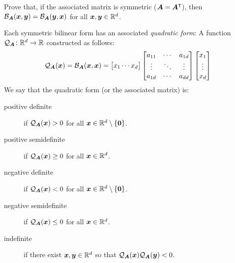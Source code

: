 \begin{problem}\label{problem:BilinearForm}
Prove that, if the associated matrix is symmetric ($\boldsymbol{A} = {\boldsymbol{A}}^\intercal$), then $\mathcal{B}_{\boldsymbol{A}}(\boldsymbol{x},\boldsymbol{y}) = \mathcal{B}_{\boldsymbol{A}}(\boldsymbol{y},\boldsymbol{x})$ for all $\boldsymbol{x}, \boldsymbol{y} \in \mathbb{R}^d$.
\end{problem}

\begin{example}\label{example:QuadraticForm}
Each symmetric bilinear form has an associated \emph{quadratic form}: A function $\mathcal{Q}_{\boldsymbol{A}} \colon \mathbb{R}^d \to \mathbb{R}$ constructed as follows:
\begin{equation*}
\mathcal{Q}_{\boldsymbol{A}}(\boldsymbol{x}) = \mathcal{B}_{\boldsymbol{A}}(\boldsymbol{x},\boldsymbol{x}) = \begin{bmatrix} x_1 \dotsb x_d \end{bmatrix} \begin{bmatrix} a_{11} &\dotsb &a_{1d} \\ \vdots & \ddots & \vdots \\ a_{1d} &\dotsb &a_{dd} \end{bmatrix} \begin{bmatrix} x_1 \\ \vdots \\ x_d \end{bmatrix}
\end{equation*}
We say that the quadratic form (or the associated matrix) is:
\begin{description}
\item[positive definite] if $\mathcal{Q}_{\boldsymbol{A}}(\boldsymbol{x}) > 0$ for all $\boldsymbol{x} \in \mathbb{R}^d \setminus \{ \boldsymbol{0} \}$.
\item[positive semidefinite] if $\mathcal{Q}_{\boldsymbol{A}}(\boldsymbol{x})\geq 0$ for all $\boldsymbol{x} \in \mathbb{R}^d$.
\item[negative definite] if $\mathcal{Q}_{\boldsymbol{A}}(\boldsymbol{x}) < 0$ for all $\boldsymbol{x} \in \mathbb{R}^d \setminus \{ \boldsymbol{0} \}$.
\item[negative semidefinite] if $\mathcal{Q}_{\boldsymbol{A}}(\boldsymbol{x}) \leq 0$ for all $\boldsymbol{x} \in \mathbb{R}^d$.
\item[indefinite] if there exist $\boldsymbol{x}, \boldsymbol{y} \in \mathbb{R}^d$ so that $\mathcal{Q}_{\boldsymbol{A}}(\boldsymbol{x}) \mathcal{Q}_{\boldsymbol{A}}(\boldsymbol{y}) < 0$. 
\end{description}
\end{example}

